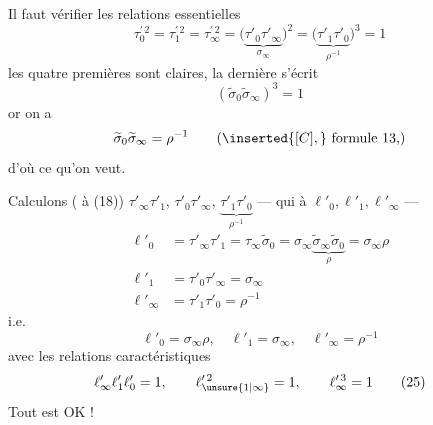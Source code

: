 Il faut vérifier les relations essentielles
\[
\tau_0^{\prime\,2}=\tau_1^{\prime\,2}=\tau_\infty^{\prime\,2}
=\bigl(\underbrace{\tau'_0\tau'_\infty}_{\sigma_\infty}\bigr)^2
=\bigl(\underbrace{\tau'_1\tau'_0}_{\rho^{-1}}\bigr)^3=1
\tag{23}
\]
les quatre premières sont claires, la dernière s'écrit
\[
(\widetilde{\sigma}_0\widetilde{\sigma}_\infty)^3=1
\]
or on a
\[
\widetilde{\sigma}_0\widetilde{\sigma}_\infty=\rho^{-1}
\qquad (\inserted{[C],}\ \text{formule 13,})
\]
d'où ce qu'on veut.

Calculons ( à (18)) $\tau'_\infty\tau'_1$, $\tau'_0\tau'_\infty$, $\underbrace{\tau'_1\tau'_0}_{\rho^{-1}}$ --- qui  à $\ell'_0,\ell'_1,\ell'_\infty$ ---
\[
\begin{aligned}
\ell'_0&=\tau'_\infty\tau'_1=\tau_\infty\widetilde{\sigma}_0
=\sigma_\infty\underbrace{\widetilde{\sigma}_\infty\widetilde{\sigma}_0}_{\rho}
=\sigma_\infty\rho\\
\ell'_1&=\tau'_0\tau'_\infty=\sigma_\infty\\
\ell'_\infty&=\tau'_1\tau'_0=\rho^{-1}
\end{aligned}
\]
i.e.
\[
\ell'_0=\sigma_\infty\rho,\quad \ell'_1=\sigma_\infty,\quad \ell'_\infty=\rho^{-1}
\tag{24}
\]
avec les relations caractéristiques
\[
\ell'_\infty\ell'_1\ell'_0=1,\qquad \ell_{\unsure{1|\infty}}^{\prime\,2}=1,\qquad \ell_\infty^{\prime\,3}=1
\tag{25}
\]
Tout est OK !


